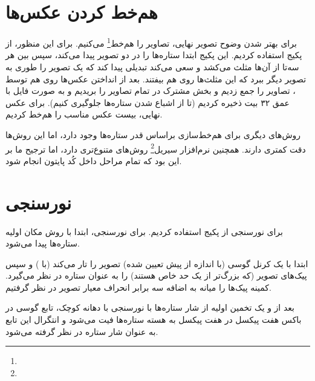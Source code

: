 \documentclass[12pt,a4paper]{article}
\begin{document}
	\section{هم‌خط کردن عکس‌ها}
	برای بهتر شدن وضوح تصویر نهایی، تصاویر را هم‌خط\footnote{} می‌کنیم. برای این منظور، از پکیج 
	استفاده کردیم. این پکیج ابتدا ستاره‌ها را در دو تصویر پیدا می‌کند، سپس بین هر سه‌تا از آن‌ها مثلث می‌کشد
	و سعی می‌کند تبدیلی پیدا کند که یک تصویر را طوری به تصویر دیگر ببرد که این مثلث‌ها روی هم بیفتند.
	بعد از انداختن عکس‌ها روی هم توسط ، تصاویر را جمع زدیم و بخش مشترک در تمام تصاویر را بریدیم
	و به صورت فایل  با عمق ۳۲ بیت ذخیره کردیم (تا از اشباع شدن ستاره‌ها جلوگیری کنیم). برای عکس نهایی،
	بیست عکس مناسب را هم‌خط کردیم.
	
	روش‌های دیگری برای هم‌خط‌سازی براساس قدر ستاره‌ها وجود دارد، اما این روش‌ها دقت کمتری دارند. همچنین نرم‌افزار
	سیریل\footnote{} روش‌های متنوع‌تری دارد، اما ترجیح ما بر این بود که تمام مراحل داخل کُد پایتون انجام شود.
	\section{نورسنجی}
	برای نورسنجی  از پکیج  استفاده کردیم. برای نورسنجی، ابتدا با روش  مکان
	اولیه ستاره‌ها پیدا می‌شود.
	
	 ابتدا با یک کرنل گوسی (با اندازه از پیش تعیین شده) تصویر را تار می‌کند
	(با ) و سپس پیک‌های تصویر (که بزرگ‌تر از یک حد خاص هستند) را به عنوان ستاره در نظر می‌گیرد. کمینه
	پیک‌ها را میانه به اضافه سه برابر انحراف معیار تصویر در نظر گرفتیم.
	
	بعد از  و یک تخمین اولیه از شار ستاره‌ها با نورسنجی با دهانه کوچک، تابع گوسی
	در باکس هفت پیکسل در هفت پیکسل به هسته ستاره‌ها فیت می‌شود و انتگرال این تابع به عنوان
	شار ستاره در نظر گرفته می‌شود.
\end{document}
